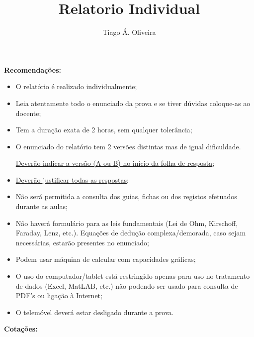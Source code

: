 \documentclass[11pt,a4paper,final,addpoints]{exam}
\author{Tiago Á. Oliveira}
\title{Relatorio Individual}
\begin{document}
\begin{center}
\end{center}

\noindent\textbf{Recomenda\c{c}\~{o}es:}
\begin{itemize}
\item O relat\'{o}rio \'{e} realizado individualmente;

\item Leia atentamente todo o enunciado da prova e se tiver d\'{u}vidas coloque-as ao docente;

\item Tem a dura\c{c}\~{a}o exata de 2 horas, sem qualquer toler\^{a}ncia;

\item O enunciado do relat\'{o}rio tem 2 vers\~{o}es distintas mas de igual dificuldade. 

\underline{Dever\~{a}o indicar a vers\~{a}o (A ou B) no in\'{i}cio da folha de resposta};

\item \underline{Dever\~{a}o justificar todas as respostas};

\item N\~{a}o ser\'{a} permitida a consulta dos guias, fichas ou dos registos efetuados durante as aulas;

\item N\~{a}o haver\'{a} formul\'{a}rio para as leis fundamentais (Lei de Ohm, Kirschoff, Faraday, Lenz, etc.). Equa\c{c}\~{o}es de dedu\c{c}\~{a}o complexa/demorada, caso sejam necess\'{a}rias, estar\~{a}o presentes no enunciado;

\item Podem usar m\' {a}quina de calcular com capacidades gr\'{a}ficas;

\item O uso do computador/tablet est\'{a} restringido apenas para uso no tratamento de dados (Excel, MatLAB, etc.) n\~{a}o podendo ser usado para consulta de PDF's ou liga\c{c}\~{a}o \`{a} Internet;

\item O telem\'{o}vel dever\'{a} estar desligado durante a prova.
\end{itemize}

\noindent\textbf{Cota\c{c}\~{o}es:}
\begin{center}
\gradetable[h][questions]
\linebreak
\end{center}
\end{document}
